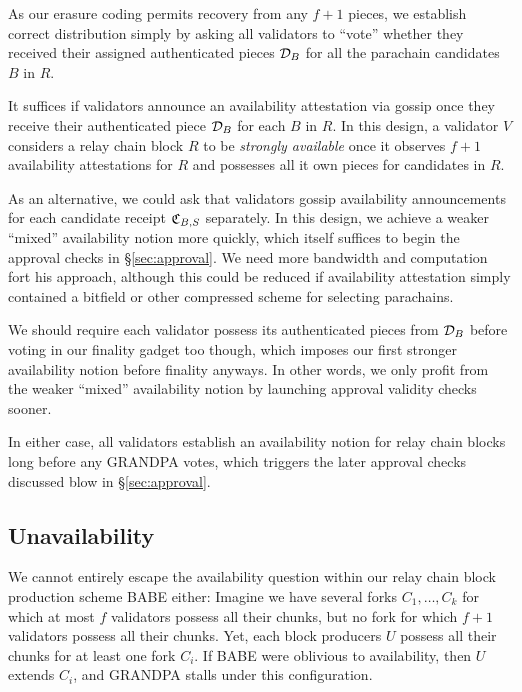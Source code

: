 As our erasure coding permits recovery from any $f+1$ pieces, we establish correct distribution simply by asking all validators to ``vote'' whether they received their assigned authenticated pieces $\mathcal{D}_B$ for all the parachain candidates $B$ in $R$. 

It suffices if validators announce an availability attestation via gossip once they receive their authenticated piece $\mathcal{D}_B$ for each $B$ in $R$.  In this design, a validator $V$ considers a relay chain block $R$ to be {\em strongly available} once it observes $f+1$ availability attestations for $R$ and possesses all it own pieces for candidates in $R$.

As an alternative, we could ask that validators gossip availability announcements for each candidate receipt $\mathfrak{C}_{B,S}$ separately.  In this design, we achieve a weaker ``mixed'' availability notion more quickly, which itself suffices to begin the approval checks in \S\ref{sec:approval}.  We need more bandwidth and computation fort his approach, although this could be reduced if availability attestation simply contained a bitfield or other compressed scheme for selecting parachains.

We should require each validator possess its authenticated pieces from $\mathcal{D}_B$ before voting in our finality gadget too though, which imposes our first stronger availability notion before finality anyways.  In other words, we only profit from the weaker ``mixed'' availability notion by launching approval validity checks sooner.

In either case, all validators establish an availability notion for relay chain blocks long before any GRANDPA votes, which triggers the later approval checks discussed blow in \S\ref{sec:approval}.


\subsection{Unavailability}
\label{sec:unavailability} %

We cannot entirely escape the availability question within our relay chain block production scheme BABE either:  Imagine we have several forks $C_1,\ldots,C_k$ for which at most $f$ validators possess all their chunks, but no fork for which $f+1$ validators possess all their chunks.  Yet, each block producers $U$ possess all their chunks for at least one fork $C_i$.  If BABE were oblivious to availability, then $U$ extends $C_i$, and GRANDPA stalls under this configuration. 

